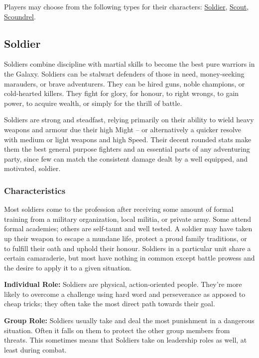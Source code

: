 \documentclass[a4paper,10pt,final,twocolumn,oneside]{book}
\newcommand{\itemLine}[2]{\textbf{#1:}{ #2}\par}
\begin{document}
Players may choose from the following types for their characters: \hyperlink{sub:soldier}{Soldier}, \hyperlink{sub:scout}{Scout}, \hyperlink{sub:scoundrel}{Scoundrel}.

\subsection*{Soldier} %
\label{sub:soldier}

Soldiers combine discipline with martial skills to become the best pure warriors in the Galaxy. Soldiers can be stalwart defenders of those in need, money-seeking marauders, or brave adventurers. They can be hired guns, noble champions, or cold-hearted killers. They fight for glory, for honour, to right wrongs, to gain power, to acquire wealth,  or simply for the thrill of battle.

Soldiers are strong and steadfast, relying primarily on their ability to wield heavy weapons and armour due their high Might -- or alternatively a quicker resolve with medium or light weapons and high Speed. Their decent rounded stats make them the best general purpose fighters and an essential parts of any adventuring party, since few can match the consistent damage dealt by a well equipped, and motivated, soldier.

\subsubsection*{Characteristics}
\label{subsub:soldierCharacteristics}

Most soldiers come to the profession after receiving some amount of formal training from a military organization, local militia, or private army. Some attend formal academies; others are self-taunt and well tested. A soldier may have taken up their weapon to escape a mundane life, protect a proud family traditions, or to fulfill their oath and uphold their honour. Soldiers in a particular unit share a certain camaraderie, but most have nothing in common except battle prowess and the desire to apply it to a given situation.

\itemLine{Individual Role}{Soldiers are physical, action-oriented people. They're more likely to overcome a challenge using hard word and perseverance as apposed to cheap tricks; they often take the most direct path towards their goal.}

\itemLine{Group Role}{Soldiers usually take and deal the most punishment in a dangerous situation. Often it falls on them to protect the other group members from threats. This sometimes means that Soldiers take on leadership roles as well, at least during combat.}
\end{document}
